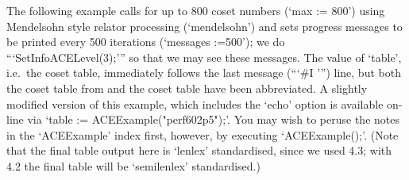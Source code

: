
The following example calls {\ACE} for up to 800 coset  numbers  (`max
:= 800') using Mendelsohn style relator processing (`mendelsohn')  and
sets progress messages to be printed every 500  iterations  (`messages
:=500'); we do ```SetInfoACELevel(3);''' so  that  we  may  see  these
messages.  The  value  of  `table',  i.e.~the  {\GAP}   coset   table,
immediately follows the last {\ACE}  message  (```\#I ''')  line,  but
both the coset table from {\ACE} and the {\GAP} coset table have  been
abbreviated. A  slightly  modified  version  of  this  example,  which
includes  the  `echo'  option  is  available  on-line  via  `table  :=
ACEExample("perf602p5");'. You may wish to peruse  the  notes  in  the
`ACEExample' index first, however, by executing `ACEExample();'. (Note
that the final table output here is `lenlex'  standardised,  since  we
used {\GAP} 4.3; with {\GAP} 4.2 the final table will be  `semilenlex'
standardised.)

